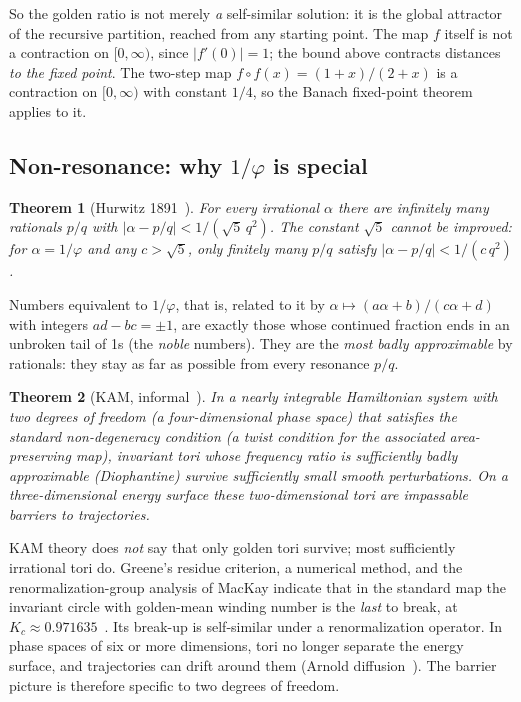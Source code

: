 \documentclass[11pt]{article}
\newtheorem{theorem}{Theorem}
\theoremstyle{definition}
\theoremstyle{remark}
\newcommand{\gr}{\varphi}
\begin{document}
So the golden ratio is not merely \emph{a} self-similar solution: it is the global attractor of the recursive partition, reached from any starting point. The map $f$ itself is not a contraction on $[0,\infty)$, since $|f'(0)| = 1$; the bound above contracts distances \emph{to the fixed point}. The two-step map $f\circ f(x) = (1+x)/(2+x)$ is a contraction on $[0,\infty)$ with constant $1/4$, so the Banach fixed-point theorem applies to it.

\subsection{Non-resonance: why $1/\gr$ is special}

\begin{theorem}[Hurwitz 1891~\cite{Hurwitz}]
For every irrational $\alpha$ there are infinitely many rationals $p/q$ with $|\alpha - p/q| < 1/(\sqrt5\, q^2)$. The constant $\sqrt5$ cannot be improved: for $\alpha = 1/\gr$ and any $c > \sqrt5$, only finitely many $p/q$ satisfy $|\alpha - p/q| < 1/(c\,q^2)$.
\end{theorem}

Numbers equivalent to $1/\gr$, that is, related to it by $\alpha \mapsto (a\alpha + b)/(c\alpha + d)$ with integers $ad - bc = \pm1$, are exactly those whose continued fraction ends in an unbroken tail of 1s (the \emph{noble} numbers). They are the \emph{most badly approximable} by rationals: they stay as far as possible from every resonance $p/q$.

\begin{theorem}[KAM, informal~\cite{Kolmogorov,Arnold63,Moser}]
In a nearly integrable Hamiltonian system with two degrees of freedom (a four-dimensional phase space) that satisfies the standard non-degeneracy condition (a twist condition for the associated area-preserving map), invariant tori whose frequency ratio is sufficiently badly approximable (Diophantine) survive sufficiently small smooth perturbations. On a three-dimensional energy surface these two-dimensional tori are impassable barriers to trajectories.
\end{theorem}

KAM theory does \emph{not} say that only golden tori survive; most sufficiently irrational tori do. Greene's residue criterion, a numerical method, and the renormalization-group analysis of MacKay indicate that in the standard map the invariant circle with golden-mean winding number is the \emph{last} to break, at $K_c \approx 0.971635$~\cite{Greene,MacKay}. Its break-up is self-similar under a renormalization operator. In phase spaces of six or more dimensions, tori no longer separate the energy surface, and trajectories can drift around them (Arnold diffusion~\cite{ArnoldDiffusion}). The barrier picture is therefore specific to two degrees of freedom.
\end{document}
